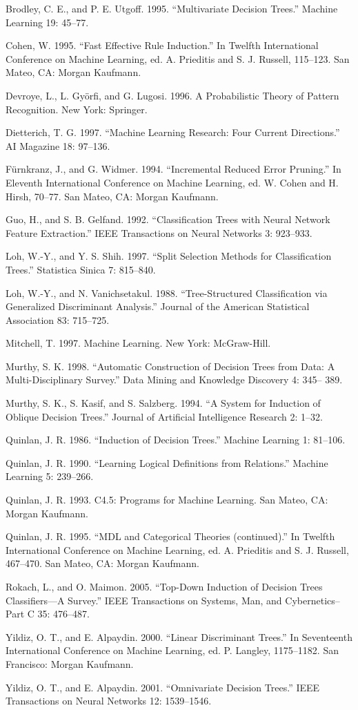 Brodley, C. E., and P. E. Utgoff. 1995. “Multivariate Decision Trees.” Machine Learning 19: 45--77.

Cohen, W. 1995. “Fast Effective Rule Induction.” In Twelfth International Conference on Machine Learning, ed. A. Prieditis and S. J. Russell, 115--123. San Mateo, CA: Morgan Kaufmann.

Devroye, L., L. Györfi, and G. Lugosi. 1996. A Probabilistic Theory of Pattern Recognition. New York: Springer.

Dietterich, T. G. 1997. “Machine Learning Research: Four Current Directions.” AI Magazine 18: 97--136.

Fürnkranz, J., and G. Widmer. 1994. “Incremental Reduced Error Pruning.” In Eleventh International Conference on Machine Learning, ed. W. Cohen and H. Hirsh, 70--77. San Mateo, CA: Morgan Kaufmann.

Guo, H., and S. B. Gelfand. 1992. “Classification Trees with Neural Network Feature Extraction.” IEEE Transactions on Neural Networks 3: 923--933.

Loh, W.-Y., and Y. S. Shih. 1997. “Split Selection Methods for Classification Trees.” Statistica Sinica 7: 815--840.

Loh, W.-Y., and N. Vanichsetakul. 1988. “Tree-Structured Classification via Generalized Discriminant Analysis.” Journal of the American Statistical Association 83: 715--725.

Mitchell, T. 1997. Machine Learning. New York: McGraw-Hill.

Murthy, S. K. 1998. “Automatic Construction of Decision Trees from Data: A Multi-Disciplinary Survey.” Data Mining and Knowledge Discovery 4: 345-- 389.

Murthy, S. K., S. Kasif, and S. Salzberg. 1994. “A System for Induction of Oblique Decision Trees.” Journal of Artificial Intelligence Research 2: 1--32.

Quinlan, J. R. 1986. “Induction of Decision Trees.” Machine Learning 1: 81--106.

Quinlan, J. R. 1990. “Learning Logical Definitions from Relations.” Machine Learning 5: 239--266.

Quinlan, J. R. 1993. C4.5: Programs for Machine Learning. San Mateo, CA: Morgan Kaufmann.

Quinlan, J. R. 1995. “MDL and Categorical Theories (continued).” In Twelfth International Conference on Machine Learning, ed. A. Prieditis and S. J. Russell, 467--470. San Mateo, CA: Morgan Kaufmann.

Rokach, L., and O. Maimon. 2005. “Top-Down Induction of Decision Trees Classifiers---A Survey.” IEEE Transactions on Systems, Man, and Cybernetics-- Part C 35: 476--487.

Yildiz, O. T., and E. Alpaydin. 2000. “Linear Discriminant Trees.” In Seventeenth International Conference on Machine Learning, ed. P. Langley, 1175--1182. San Francisco: Morgan Kaufmann.

Yildiz, O. T., and E. Alpaydin. 2001. “Omnivariate Decision Trees.” IEEE Transactions on Neural Networks 12: 1539--1546.
